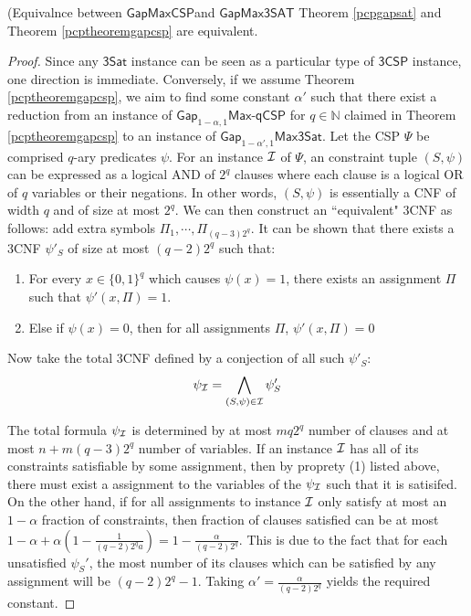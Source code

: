 \begin{lemma} (Equivalnce between $\mathsf{GapMaxCSP}$and $\mathsf{GapMax3SAT}$ Theorem \ref{pcpgapsat} and Theorem \ref{pcptheoremgapcsp} are equivalent.
\end{lemma}
%
\begin{proof}
Since any $\mathsf{3Sat}$ instance can be seen as a particular type of $\mathsf{3CSP}$ instance, one direction is immediate. Conversely, if we assume Theorem \ref{pcptheoremgapcsp}, we aim to find some constant $\alpha'$ such that there exist a reduction from an instance of $\mathsf{Gap}_{1-\alpha,1}\mathsf{Max}$-$\mathsf{qCSP}$ for $q \in \mathbb{N}$ claimed in Theorem \ref{pcptheoremgapcsp} to an instance of $\mathsf{Gap}_{1-\alpha',1}\mathsf{Max3Sat}$.
%
Let the CSP $\Psi$ be comprised $q$-ary predicates $\psi$. For an instance $\mathcal{I}$ of $\Psi$, an constraint tuple $(S,\psi)$ can be expressed as a logical AND of $2^q$ clauses where each clause is a logical OR of $q$ variables or their negations. In other words, $(S,\psi)$ is essentially a CNF of width $q$ and of size at most $2^q$. We can then construct an ``equivalent" 3CNF as follows: add extra symbols $\Pi_{1}, \cdots, \Pi_{(q-3)2^{q}}$. It can be shown that there exists a 3CNF $\psi'_S$ of size at most $(q-2)2^{q}$ such that:

\begin{enumerate}
  \item For every $x \in \{0,1\}^q$ which causes $\psi(x) = 1$, there exists an assignment $\Pi$ such that $\psi'(x,\Pi) = 1$.
  \item Else if $\psi(x) = 0$, then for all assignments $\Pi$, $\psi'(x,\Pi) = 0$
\end{enumerate}

Now take the total 3CNF defined by a conjection of all such $\psi'_S$:
\[ \psi_{\mathcal{I}} = \bigwedge_{(S,\psi) \in \mathcal{I}}  \psi_S' \]

The total formula $\psi_{\mathcal{I}}$ is determined by at most $mq2^q$ number of clauses and at most $n + m(q-3)2^q$ number of variables.
%
If an instance $\mathcal{I}$ has all of its constraints satisfiable by some assignment, then by proprety (1) listed above, there must exist a assignment to the variables of the $\psi_{\mathcal{I}}$ such that it is satisifed.
%
On the other hand, if for all assignments to instance $\mathcal{I}$ only satisfy at most an $1 - \alpha$ fraction of constraints, then fraction of clauses satisfied can be at most $1 - \alpha + \alpha(1 - \frac{1}{(q-2)2^qa}) = 1 - \frac{\alpha}{(q-2)2^q}$. This is due to the fact that for each unsatisfied $\psi_S'$, the most number of its clauses which can be satisfied by any assignment will be $(q-2)2^q - 1$. Taking $\alpha' = \frac{\alpha}{(q-2)2^q}$
yields the required constant.
\end{proof}




